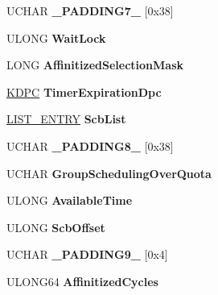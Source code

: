 \begin{DoxyCompactItemize}
\mbox{\label{struct___k_p_r_c_b_a151354ee4d0119a565b40ad854aa89c4}} 
U\+C\+H\+AR {\bfseries \+\_\+\+P\+A\+D\+D\+I\+N\+G7\+\_\+} \mbox{[}0x38\mbox{]}
\item 
\mbox{\label{struct___k_p_r_c_b_a2125e8ba07a83966f6f0093c1dcce56f}} 
U\+L\+O\+NG {\bfseries Wait\+Lock}
\item 
\mbox{\label{struct___k_p_r_c_b_a379070f0078312ddd8cef209ec426901}} 
L\+O\+NG {\bfseries Affinitized\+Selection\+Mask}
\item 
\mbox{\label{struct___k_p_r_c_b_a653a55758a8793c5d9f59570cb55e462}} 
\hyperlink{struct___k_d_p_c}{K\+D\+PC} {\bfseries Timer\+Expiration\+Dpc}
\item 
\mbox{\label{struct___k_p_r_c_b_a4fbc63912a5d6cf4f2fb0cef423b78f0}} 
\hyperlink{struct___l_i_s_t___e_n_t_r_y}{L\+I\+S\+T\+\_\+\+E\+N\+T\+RY} {\bfseries Scb\+List}
\item 
\mbox{\label{struct___k_p_r_c_b_a7d42b450824717ef1400da98ddf8af7e}} 
U\+C\+H\+AR {\bfseries \+\_\+\+P\+A\+D\+D\+I\+N\+G8\+\_\+} \mbox{[}0x38\mbox{]}
\item 
\mbox{\label{struct___k_p_r_c_b_a0072e2af1d66bce50b4420c234137c5d}} 
U\+C\+H\+AR {\bfseries Group\+Scheduling\+Over\+Quota}
\item 
\mbox{\label{struct___k_p_r_c_b_a407a5ae5d28933cef76320c3aa7da277}} 
U\+L\+O\+NG {\bfseries Available\+Time}
\item 
\mbox{\label{struct___k_p_r_c_b_a975aa1aacdbd55799ee8caac2c74efa5}} 
U\+L\+O\+NG {\bfseries Scb\+Offset}
\item 
\mbox{\label{struct___k_p_r_c_b_a80dc7dd8da229b068d26e126dff2a1ca}} 
U\+C\+H\+AR {\bfseries \+\_\+\+P\+A\+D\+D\+I\+N\+G9\+\_\+} \mbox{[}0x4\mbox{]}
\item 
\mbox{\label{struct___k_p_r_c_b_a3a30739806ab57590ee79f5f4cd40cb0}} 
U\+L\+O\+N\+G64 {\bfseries Affinitized\+Cycles}

\end{DoxyCompactItemize}
